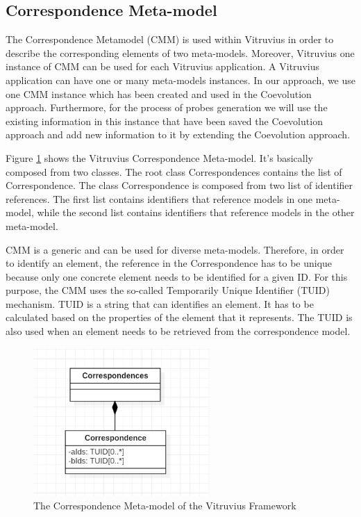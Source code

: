 \subsection{Correspondence Meta-model}
\label{sec:Correspondence Meta-model}
The Correspondence Metamodel (CMM) is used within Vitruvius in order to describe the corresponding elements of two meta-models. Moreover, Vitruvius one instance of CMM can be used for each Vitruvius application. A Vitruvius application can have one or many meta-models instances.  In our approach, we use one CMM instance which has been created and used in the Coevolution approach. Furthermore, for the process of probes generation we will use the existing information in this instance that have been saved the Coevolution approach and add new information to it by extending the Coevolution approach.

Figure \ref{fig:correspondence_model} shows the Vitruvius Correspondence Meta-model. It's basically composed from two classes. The root class Correspondences contains the list of Correspondence. The class Correspondence is composed from two list of identifier references. The first list contains identifiers that reference models in one meta-model, while the second list contains identifiers that reference models in the other meta-model.

CMM is a generic and can be used for diverse meta-models. Therefore, in order to identify an element, the reference in the Correspondence has to be unique because only one concrete element needs to be identified for a given ID. For this purpose, the CMM uses the so-called Temporarily Unique Identifier (TUID) mechanism. TUID is a string that can identifies an element. It has to be calculated based on the properties of the element that it represents. The TUID is also used when an element needs to be retrieved from the correspondence model.    

\begin{figure}[h]
\centering
\includegraphics[width=0.6\textwidth]{figures/correspondence_model}
\caption{The Correspondence Meta-model of the Vitruvius Framework}
\label{fig:correspondence_model}
\end{figure} 


